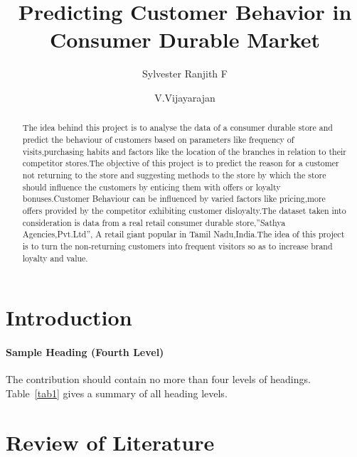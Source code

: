 \documentclass[runningheads]{llncs}
\begin{document}
%
\title{Predicting Customer Behavior in Consumer Durable Market}
%
%
\author{Sylvester Ranjith F  
\and V.Vijayarajan}
%
%
%
\maketitle              %
%
\begin{abstract}

The idea behind this project is to analyse the data of a consumer durable store and predict the behaviour of customers based on parameters like frequency of visits,purchasing habits  and factors like the location of the branches in relation to their competitor stores.The objective of this project is to predict the reason for a customer not returning to the store and suggesting methods to the store by which the store should influence the customers by enticing them with offers or loyalty bonuses.Customer Behaviour can be influenced by varied factors like pricing,more offers provided by the competitor exhibiting customer disloyalty.The dataset taken into consideration is
data from a real retail consumer durable store,”Sathya Agencies,Pvt.Ltd”, A retail
giant popular in Tamil Nadu,India.The idea of this project is to turn the non-returning customers into frequent visitors so as to increase brand loyalty and value.


\end{abstract}
%
%
%
\section{Introduction}

\paragraph{Sample Heading (Fourth Level)}
The contribution should contain no more than four levels of
headings. Table~\ref{tab1} gives a summary of all heading levels.

\section{Review of Literature}
\end{document}
